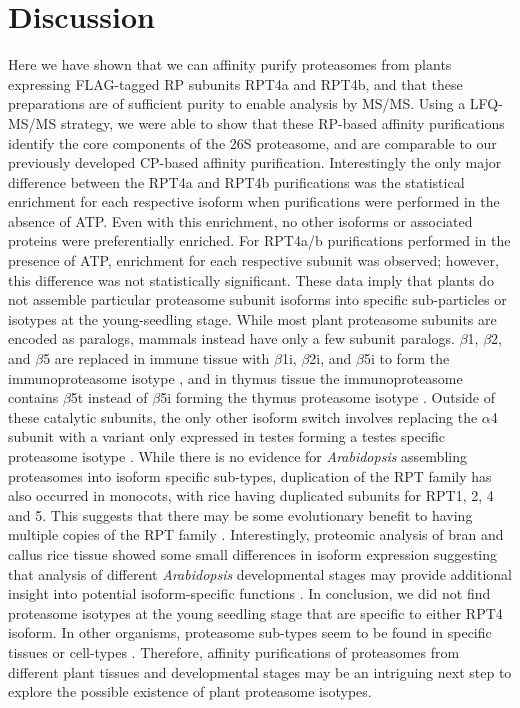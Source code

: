 \section{Discussion}
 	Here we have shown that we can affinity purify proteasomes from plants expressing FLAG-tagged RP subunits RPT4a and RPT4b, and that these preparations are of sufficient purity to enable analysis by MS/MS.  Using a LFQ-MS/MS strategy, we were able to show that these RP-based affinity purifications identify the core components of the 26S proteasome, and are comparable to our previously developed CP-based affinity purification. Interestingly the only major difference between the RPT4a and RPT4b purifications was the statistical enrichment for each respective isoform when purifications were performed in the absence of ATP. Even with this enrichment, no other isoforms or associated proteins were preferentially enriched. For RPT4a/b purifications performed in the presence of ATP, enrichment for each respective subunit was observed; however, this difference was not statistically significant. These data imply that plants do not assemble particular proteasome subunit isoforms into specific sub-particles or isotypes at the young-seedling stage. While most plant proteasome subunits are encoded as paralogs, mammals instead have only a few subunit paralogs. $\beta$1, $\beta$2, and $\beta$5 are replaced in immune tissue with $\beta$1i, $\beta$2i, and $\beta$5i to form the immunoproteasome isotype \citep{nandi96}, and in thymus tissue the immunoproteasome contains $\beta$5t instead of $\beta$5i forming the thymus proteasome isotype \citep{murata07}. Outside of these catalytic subunits, the only other isoform switch involves replacing the $\alpha$4 subunit with a variant only expressed in testes forming a testes specific proteasome isotype \citep{belote98, uechi14}.   While there is no evidence for \textit{Arabidopsis} assembling proteasomes into isoform specific sub-types, duplication of the RPT family has also occurred in monocots, with rice having duplicated subunits for RPT1, 2, 4 and 5. This suggests that there may be some evolutionary benefit to having multiple copies of the RPT family \citep{shibahara04}. Interestingly, proteomic analysis of bran and callus rice tissue showed some small differences in isoform expression suggesting that analysis of different \textit{Arabidopsis} developmental stages may provide additional insight into potential isoform-specific functions \citep{shibahara04}. In conclusion, we did not find proteasome isotypes at the young seedling stage that are specific to either RPT4 isoform. In other organisms, proteasome sub-types seem to be found in specific tissues or cell-types \citep{belote98, murata07, nandi96, uechi14}. Therefore, affinity purifications of proteasomes from different plant tissues and developmental stages may be an intriguing next step to explore the possible existence of plant proteasome isotypes.
